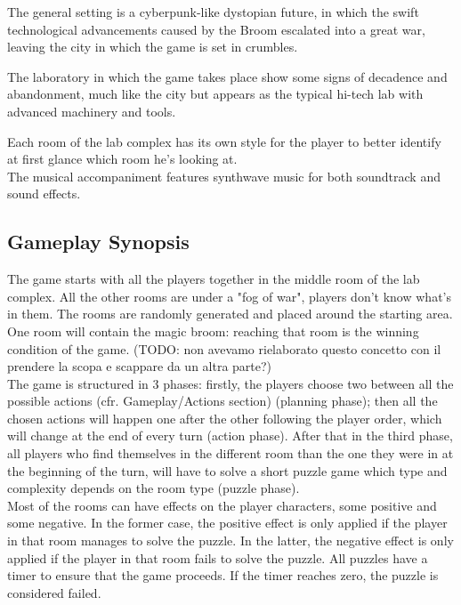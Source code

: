 The general setting is a cyberpunk-like dystopian future, in which the swift technological advancements caused by the Broom escalated into a great war, leaving the city in which the game is set in crumbles.

The laboratory in which the game takes place show some signs of decadence and abandonment, much like the city but appears as the typical hi-tech lab with advanced machinery and tools.


Each room of the lab complex has its own style for the player to better identify at first glance which room he's looking at. \\

The musical accompaniment features synthwave music for both soundtrack and sound effects.

\subsection{Gameplay Synopsis}

The game starts with all the players together in the middle room of the lab complex. All the other rooms are
under a "fog of war", players don't know what's in them. The rooms are randomly generated and placed
around the starting area. One room will contain the magic broom: reaching that room is the winning
condition of the game. (TODO: non avevamo rielaborato questo concetto con il prendere la scopa e scappare da un altra parte?) \\

The game is structured in 3 phases: firstly, the players choose two between all the possible actions (cfr. Gameplay/Actions section)  (planning phase);
then all the chosen actions will happen one after the other following the player order, which will change at the end of every turn (action phase). After that in the third phase, all players who find themselves in the different room than the one they were in at the beginning of the turn, will have to solve a short puzzle game which type and complexity depends on the room type (puzzle phase). \\

Most of the rooms can have effects on the player characters, some positive and some negative. In the former case, the positive effect is only applied if the player in that room manages to solve the puzzle. In the latter, the negative effect is only applied if the player in that room fails to solve the puzzle. All puzzles have a timer to ensure that the game proceeds. If the timer reaches zero, the puzzle is considered failed. 


\pagebreak
\clearpage 